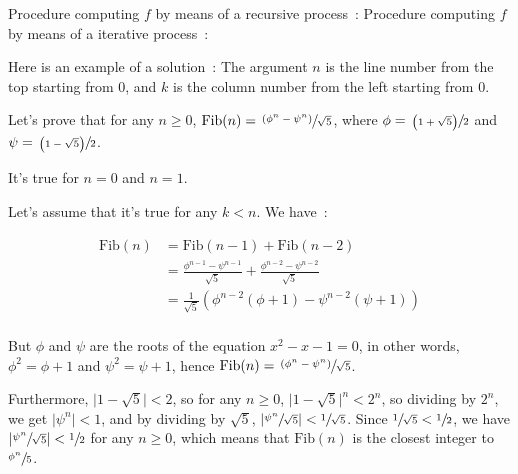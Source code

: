 \begin{exe} %
    Procedure computing $f$ by means of a recursive process :
    Procedure computing $f$ by means of a iterative process :
\end{exe}

\begin{exe} %
    Here is an example of a solution :
    The argument $n$ is the line number from the top starting from $0$, and 
    $k$ is the column number from the left starting from $0$.
\end{exe}

\begin{exe} %
    Let’s prove that for any $n \geq 0$, $\text{Fib}(n) = \sfrac{\left( \phi^n 
    - \psi^n \right)}{\sqrt{5}}$, where $\phi = \sfrac{\left( 1 + \sqrt{5} 
    \right)}{2}$ and $\psi = \sfrac{\left( 1 - \sqrt{5} \right)}{2}$.

    It’s true for $n = 0$ and $n = 1$.

    Let’s assume that it’s true for any $k < n$. We have :

    \begin{align*}
        \text{Fib}(n) &= \text{Fib}(n - 1) + \text{Fib}(n - 2) \\
        &= \frac{\phi^{n - 1} - \psi^{n - 1}}{\sqrt{5}} + \frac{\phi^{n - 2} 
        - \psi^{n - 2}}{\sqrt{5}} \\
        &= \frac{1}{\sqrt{5}}\left(\phi^{n - 2}\left(\phi + 1\right) - \psi^{n 
        - 2}\left(\psi + 1\right) \right) \\
    \end{align*}

    But $\phi$ and $\psi$ are the roots of the equation $x^2 - x - 1 = 0$, in 
    other words, $\phi^2 = \phi + 1$ and $\psi^2 = \psi + 1$, hence 
    $\text{Fib}(n) = \sfrac{\left(\phi^n - \psi^n \right)}{\sqrt{5}}$.

    Furthermore, $ \lvert 1 - \sqrt{5} \rvert < 2 $, so for any $n \geq 0$, 
    $ \lvert 1 - \sqrt{5} \rvert^n < 2^n $, so dividing by $2^n$, we get 
    $ \lvert \psi^n \rvert < 1 $, and by dividing by $\sqrt{5}$, $ \lvert 
    \sfrac{\psi^n}{\sqrt{5}} \rvert < \sfrac{1}{\sqrt{5}} $. Since 
    $ \sfrac{1}{\sqrt{5}} < \sfrac{1}{2} $, we have $ \lvert 
    \sfrac{\psi^n}{\sqrt{5}} \rvert < \sfrac{1}{2} $ for any $n \geq 0$, which 
    means that $\text{Fib}(n)$ is the closest integer to $\sfrac{\phi^n}{5}$.

\end{exe}

